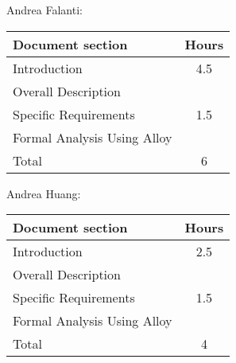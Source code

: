 Andrea Falanti:

\begin{tabular}{|l|c|}
    \hline
    Document section & Hours \\
    \hline
     Introduction & 4.5 \\
     Overall Description &  \\
     Specific Requirements & 1.5\\
     Formal Analysis Using Alloy & \\
     \hline
     Total & 6\\
     \hline
\end{tabular}
\vskip 0.3in

Andrea Huang:

\begin{tabular}{|l|c|}
    \hline
    Document section & Hours \\
    \hline
     Introduction &  2.5\\
     Overall Description &  \\
     Specific Requirements & 1.5\\
     Formal Analysis Using Alloy & \\
     \hline
     Total & 4\\
     \hline
\end{tabular}